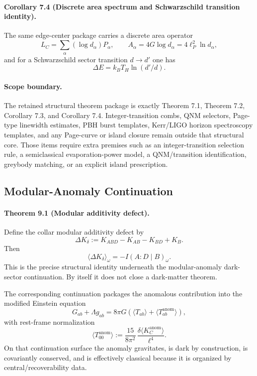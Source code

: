 \paragraph{\textbf{Corollary 7.4 (Discrete area spectrum and Schwarzschild transition identity).}}
The same edge-center package carries a discrete area operator
\[
L_C=\sum_\alpha (\log d_\alpha)P_\alpha,
\qquad
A_\alpha=4G\log d_\alpha=4\ell_P^2\ln d_\alpha,
\]
and for a Schwarzschild sector transition \(d\to d'\) one has
\[
\Delta E=k_B T_H\ln(d'/d).
\]

\paragraph{\textbf{Scope boundary.}}
The retained structural theorem package is exactly Theorem 7.1, Theorem 7.2, Corollary 7.3, and
Corollary 7.4. Integer-transition combs, QNM selectors, Page-type linewidth estimates, PBH burst
templates, Kerr/LIGO horizon spectroscopy templates, and any Page-curve or island closure remain
outside that structural core. Those items require extra premises such as an integer-transition
selection rule, a semiclassical evaporation-power model, a QNM/transition identification, greybody
matching, or an explicit island prescription.

\subsection{Modular-Anomaly Continuation}

\paragraph{\textbf{Theorem 9.1 (Modular additivity defect).}}
Define the collar modular additivity defect by
\[
\Delta K_\delta:=K_{ABD}-K_{AB}-K_{BD}+K_B.
\]
Then
\[
\langle \Delta K_\delta\rangle_\omega=-I(A:D\mid B)_\omega.
\]
This is the precise structural identity underneath the modular-anomaly dark-sector continuation. By itself it does not close a dark-matter theorem.

The corresponding continuation packages the anomalous contribution into the modified Einstein
equation
\[
G_{ab}+\Lambda g_{ab}
=
8\pi G\left(\langle T_{ab}\rangle+\langle T_{ab}^{\mathrm{anom}}\rangle\right),
\]
with rest-frame normalization
\[
\langle T_{00}^{\mathrm{anom}}\rangle
:=
\frac{15}{8\pi^2}\,
\frac{\delta\langle K_C^{\mathrm{anom}}\rangle}{\ell^4}.
\]
On that continuation surface the anomaly gravitates, is dark by construction, is covariantly
conserved, and is effectively classical because it is organized by central/recoverability data.

